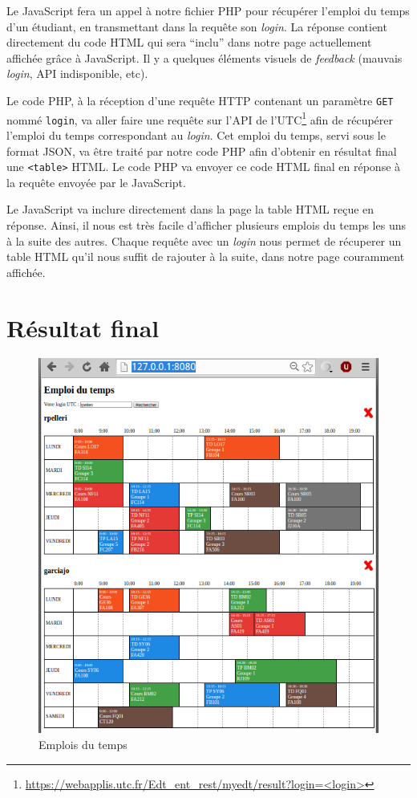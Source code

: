 Le JavaScript fera un appel à notre fichier PHP pour récupérer l'emploi du temps d'un étudiant, en transmettant dans la requête son \textit{login}. La réponse contient directement du code HTML qui sera ``inclu'' dans notre page actuellement affichée grâce à JavaScript. Il y a quelques éléments visuels de \textit{feedback} (mauvais \textit{login}, API indisponible, etc).

\medskip

Le code PHP, à la réception d'une requête HTTP contenant un paramètre \lstinline{GET} nommé \lstinline{login}, va aller faire une requête sur l'API de l'UTC\footnote{\url{https://webapplis.utc.fr/Edt_ent_rest/myedt/result?login=<login>}} afin de récupérer l'emploi du temps correspondant au \textit{login}. Cet emploi du temps, servi sous le format JSON, va être traité par notre code PHP afin d'obtenir en résultat final une \lstinline{<table>} HTML. Le code PHP va envoyer ce code HTML final en réponse à la requête envoyée par le JavaScript.

\medskip

Le JavaScript va inclure directement dans la page la table HTML reçue en réponse. Ainsi, il nous est très facile d'afficher plusieurs emplois du temps les uns à la suite des autres. Chaque requête avec un \textit{login} nous permet de récuperer un table HTML qu'il nous suffit de rajouter à la suite, dans notre page couramment affichée.

\section{Résultat final}

\begin{figure}[H]
    \centering\includegraphics[width=1.00\textwidth]{images/edt.png}
    \caption{Emplois du temps}
\end{figure}

